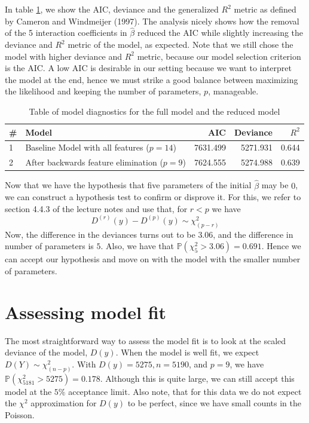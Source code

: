 \documentclass[a4paper,11pt]{article}
\begin{document}
In table \ref{tab:backwards_elimination}, we show the AIC, deviance and the generalized $R^2$ metric as defined by Cameron and Windmeijer (1997). The analysis nicely shows how the removal of the 5 interaction coefficients in $\hat{\beta}$ reduced the AIC while slightly increasing the deviance and $R^2$ metric of the model, as expected. Note that we still chose the model with higher deviance and $R^2$ metric, because our model selection criterion is the AIC. A low AIC is desirable in our setting because we want to interpret the model at the end, hence we must strike a good balance between maximizing the likelihood and keeping the number of parameters, $p$, manageable.

\begin{table}[h]
    \centering
    \begin{tabular}{|l|l|r|r|r|}
    \hline
 \# &Model & AIC & Deviance & $R^2$\\
    \hline
1&    Baseline Model with all features ($p=14$) &  7631.499 & 5271.931 & 0.644\\
2&    After backwards feature elimination ($p=9$) & 7624.555 & 5274.988  & 0.639\\
        \hline
        
    \end{tabular}
    \caption{Table of model diagnostics for the full model and the reduced model}
    \label{tab:backwards_elimination}
\end{table}

Now that we have the hypothesis that five parameters of the initial $\hat{\beta}$ may be $0$, we can construct a hypothesis test to confirm or disprove it. For this, we refer to section 4.4.3 of the lecture notes and use that, for $r<p$ we have
\begin{equation}
D^{(r)}(y) - D^{(p)}(y) \sim \chi^2_{(p-r)}
\end{equation}
Now, the difference in the deviances turns out to be $3.06$, and the difference in number of parameters is $5$. Also, we have that $\mathbb{P}( \chi^2_{5} > 3.06) = 0.691$. Hence we can accept our hypothesis and move on with the model with the smaller number of parameters.

\section{Assessing model fit}
The most straightforward way to assess the model fit is to look at the scaled deviance of the model, $D(y)$. When the model is well fit, we expect $D(Y) \sim \chi^2_{(n-p)}$. With $D(y) = 5275, n = 5190$, and $p=9$, we have $\mathbb{P}( \chi^2_{5181} > 5275) = 0.178$. Although this is quite large, we can still accept this model at the $5\%$ acceptance limit. Also note, that for this data we do not expect the $\chi^2$ approximation for $D(y)$ to be perfect, since we have small counts in the Poisson.
\end{document}

